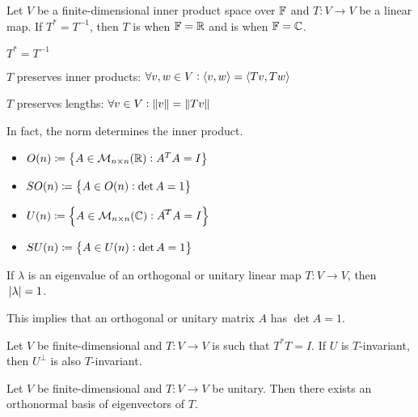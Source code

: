 \documentclass{styles/tufte}
\begin{document}
  \begin{definition}{}{}
    Let $V$ be a finite-dimensional inner product space over $\mathbb{F}$ and $T: V \to V$ be a linear map. If $T^* = T^{-1}$, then $T$ is  when $\mathbb{F} = \mathbb{R}$ and is  when $\mathbb{F} = \mathbb{C}$.
  \end{definition}
  
  \begin{theorem}{}{}
    \begin{romanenum}
      \item $T^* = T^{-1}$
      \item $T$ preserves inner products: $\forall v, w \in V: \langle v, w \rangle = \langle Tv, Tw \rangle$
      \item $T$ preserves lengths: $\forall v \in V: \norm{v} = \norm{Tv}$
    \end{romanenum}
  \end{theorem}
  
  In fact, the norm determines the inner product.
  
  \begin{definition}{}{}
    \begin{itemize}
      \item {} $O(n) \coloneqq \set{A \in \mathcal{M}_{n\times n}(\mathbb{R}): A^TA = I}$
      \item {} $SO(n) \coloneqq \set{A \in O(n): \det A = 1}$
      \item {} $U(n) \defeq \set{A \in \matspace{n}{n}{\CC}: \overline{A}^TA = I}$
      \item {} $SU(n) \coloneqq \set{A \in U(n): \det A = 1}$
    \end{itemize}
  \end{definition}
  
  \begin{lemma}{}{}
    If $\lambda$ is an eigenvalue of an orthogonal or unitary linear map $T: V \to V$, then $\abs{\lambda} = 1$.
    
    This implies that an orthogonal or unitary matrix $A$ has $\det A = 1$.
  \end{lemma}
  
  \begin{lemma}{}{}
    Let $V$ be finite-dimensional and $T: V \to V$ is such that $T^* T = I$. If $U$ is $T$-invariant, then $U^\bot$ is also $T$-invariant.
  \end{lemma}
  
  \begin{theorem}{}{}
    Let $V$ be finite-dimensional and $T: V \to V$ be unitary. Then there exists an orthonormal basis of eigenvectors of $T$.
  \end{theorem}
  
\end{document}
